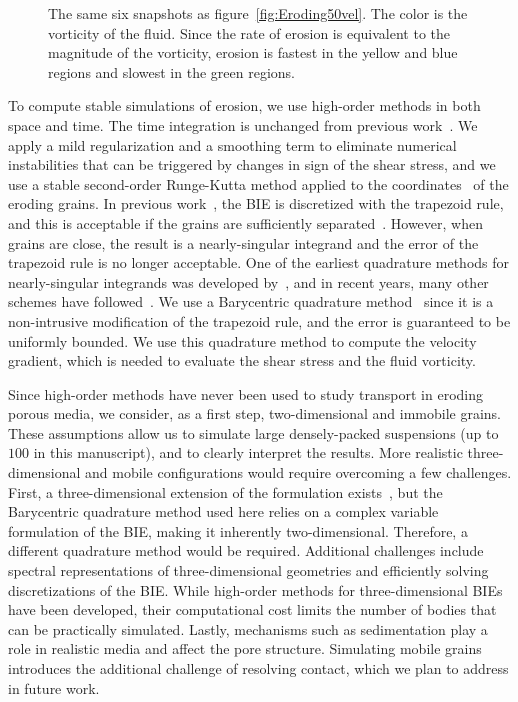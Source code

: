 \documentclass{jfm}
\begin{document}
\begin{figure}
\begin{center}
\caption{\label{fig:Eroding50vort} The same six snapshots as
figure~\ref{fig:Eroding50vel}.  The color is the vorticity of the fluid.
Since the rate of erosion is equivalent to the magnitude of the
vorticity, erosion is fastest in the yellow and blue regions and slowest
in the green regions.}
\end{center}
\end{figure}

To compute stable simulations of erosion, we use high-order methods in
both space and time. The time integration is unchanged from previous
work~\citep{qua-moo2018}.  We apply a mild regularization and a
smoothing term to eliminate numerical instabilities that can be
triggered by changes in sign of the shear stress, and we use a stable
second-order Runge-Kutta method applied to the {\thL}
coordinates~\citep{hou-low-she1994} of the eroding grains. In previous
work~\citep{qua-moo2018}, the BIE is discretized with the trapezoid
rule, and this is acceptable if the grains are sufficiently
separated~\citep{tre-wei2014}. However, when grains are close, the
result is a nearly-singular integrand and the error of the trapezoid
rule is no longer acceptable. One of the earliest quadrature methods for
nearly-singular integrands was developed by~\citet{bak-she1986}, and in
recent years, many other schemes have followed~\citep{kli-tor2018,
hel-oja2008a, bea-yin-wil2016, bea-lai2001, klo-bar-gre-one2013}.  We
use a Barycentric quadrature method~\citep{bar2014, bar-wu-vee2015}
since it is a non-intrusive modification of the trapezoid rule, and the
error is guaranteed to be uniformly bounded.  We use this quadrature
method to compute the velocity gradient, which is needed to evaluate the
shear stress and the fluid vorticity.

Since high-order methods have never been used to study transport in
eroding porous media, we consider, as a first step, two-dimensional and
immobile grains. These assumptions allow us to simulate large
densely-packed suspensions (up to $100$ in this manuscript), and to
clearly interpret the results. More realistic three-dimensional and
mobile configurations would require overcoming a few challenges. First,
a three-dimensional extension of the {\thL} formulation
exists~\citep{amb-sie-tlu2013}, but the Barycentric quadrature method
used here relies on a complex variable formulation of the BIE, making it
inherently two-dimensional. Therefore, a different quadrature method
would be required. Additional challenges include spectral
representations of three-dimensional geometries and efficiently solving
discretizations of the BIE. While high-order methods for
three-dimensional BIEs have been developed, their computational cost
limits the number of bodies that can be practically simulated.  Lastly,
mechanisms such as sedimentation play a role in realistic media and
affect the pore structure. Simulating mobile grains introduces the
additional challenge of resolving contact, which we plan to address in
future work.
\end{document}
